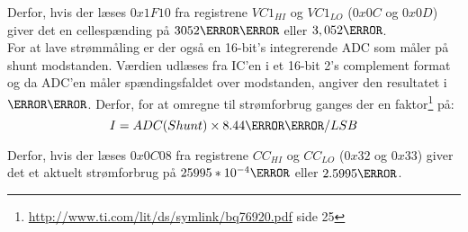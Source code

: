 Derfor, hvis der læses $0x1F10$ fra registrene $VC1_{HI}$ og $VC1_{LO}$ ($0x0C$ og $0x0D$) giver det en cellespænding på $3052\milli\volt$ eller $3,052\volt$.\\

For at lave strømmåling er der også en 16-bit's integrerende ADC som måler på shunt modstanden. Værdien udlæses fra IC'en i et 16-bit 2's complement format og da ADC'en måler spændingsfaldet over modstanden, angiver den resultatet i $\micro\volt$. Derfor, for at omregne til strømforbrug ganges der en faktor\footnote{\url{http://www.ti.com/lit/ds/symlink/bq76920.pdf} side 25} på: 
\begin {equation} 
I = ADC(Shunt) \times 8.44\micro\volt/LSB
\end {equation}

Derfor, hvis der læses $0x0C08$ fra registrene $CC_{HI}$ og $CC_{LO}$ ($0x32$ og $0x33$) giver det et aktuelt strømforbrug på $25995*10^{-4}\ampere$ eller $2.5995\ampere$.
